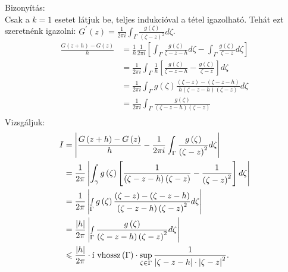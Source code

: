 \documentclass[12pt,a4paper]{scrartcl}
\newenvironment{bizonyitas}{}{}
\begin{document}
\begin{bizonyitas}

Bizonyítás:\\
Csak a \(k = 1\) esetet látjuk be, teljes indukcióval a tétel
igazolható. Tehát ezt szeretnénk igazolni:
\(G^{\prime}\left( z \right) = \frac{1}{2\pi i}{\int_{\Gamma}{\frac{g\left( \zeta \right)}{\left( {\zeta - z} \right)^{2}}d\zeta}}\).
\[\begin{aligned}
  \frac{{G\left( {z + h} \right) - G\left( z \right)}}{h} &  = \frac{1}{h}\frac{1}{{2\pi i}}\left[ {\int_\Gamma  {\frac{{g\left( \zeta  \right)}}{{\zeta  - z - h}}d\zeta }  - \int_\Gamma  {\frac{{g\left( \zeta  \right)}}{{\zeta  - z}}d\zeta } } \right] \\ 
   &  = \frac{1}{{2\pi i}}\int_\Gamma  {\frac{1}{h}\left[ {\frac{{g\left( \zeta  \right)}}{{\zeta  - z - h}} - \frac{{g\left( \zeta  \right)}}{{\zeta  - z}}} \right]d\zeta }  \\ 
   &  = \frac{1}{{2\pi i}}\int_\Gamma  {g\left( \zeta  \right)\frac{{\left( {\zeta  - z} \right) - \left( {\zeta  - z - h} \right)}}{{h\left( {\zeta  - z - h} \right)\left( {\zeta  - z} \right)}}d\zeta }  \\ 
   &  = \frac{1}{{2\pi i}}\int_\Gamma  {\frac{{g\left( \zeta  \right)}}{{\left( {\zeta  - z - h} \right)\left( {\zeta  - z} \right)}}}  \\ 
\end{aligned} \] Vizsgáljuk: \[\begin{aligned}
  I &  = \left| {\frac{{G\left( {z + h} \right) - G\left( z \right)}}{h} - \frac{1}{{2\pi i}}\int_\Gamma  {\frac{{g\left( \zeta  \right)}}{{{{\left( {\zeta  - z} \right)}^2}}}d\zeta } } \right| \\ 
   &  = \frac{1}{{2\pi }}\left| {\int_\gamma  {g\left( \zeta  \right)\left[ {\frac{1}{{\left( {\zeta  - z - h} \right)\left( {\zeta  - z} \right)}} - \frac{1}{{{{\left( {\zeta  - z} \right)}^2}}}} \right]d\zeta } } \right| \\ 
   &  = \frac{1}{{2\pi }}\left| {\mathop \smallint \limits_\Gamma  g\left( \zeta  \right)\frac{{\left( {\zeta  - z} \right) - \left( {\zeta  - z - h} \right)}}{{\left( {\zeta  - z - h} \right){{\left( {\zeta  - z} \right)}^2}}}d\zeta } \right| \\ 
   &  = \frac{{\left| h \right|}}{{2\pi }}\left| {\mathop \smallint \limits_\Gamma  \frac{{g\left( \zeta  \right)}}{{\left( {\zeta  - z - h} \right){{\left( {\zeta  - z} \right)}^2}}}d\zeta } \right| \\ 
   &  \leqslant \frac{{\left| h \right|}}{{2\pi }} \cdot {\text{\'i vhossz}}\left( \Gamma  \right) \cdot \mathop {\sup }\limits_{\zeta  \in \Gamma } \frac{1}{{\left| {\zeta  - z - h} \right| \cdot {{\left| {\zeta  - z} \right|}^2}}} .\\ 

\end{aligned}\]
\end{bizonyitas}
\end{document}
